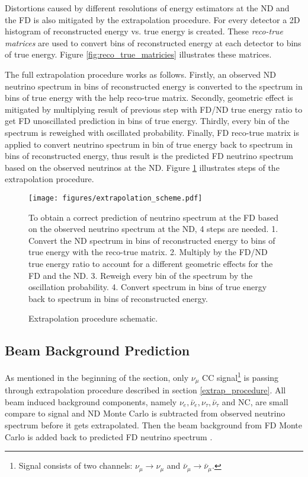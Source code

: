 Distortions caused by different resolutions of energy estimators at the ND and the FD is also mitigated by
the extrapolation procedure. For every detector a 2D histogram of reconstructed energy vs. true energy
is created. These \textit{reco-true matrices} are used to convert bins of reconstructed energy at
each detector to bins of true energy. Figure \ref{fig:reco_true_matricies} illustrates these matrices.

The full extrapolation procedure works as follows. Firstly, an observed ND neutrino spectrum in bins of 
reconstructed energy is converted to the spectrum in bins of true energy with the help reco-true 
matrix. Secondly, geometric effect is mitigated by multiplying result of previous step with FD/ND 
true energy ratio to get FD unoscillated prediction in bins of true energy. Thirdly, every bin of the 
spectrum is reweighed with oscillated probability. Finally, FD reco-true matrix is applied to 
convert neutrino spectrum in bin of true energy back to spectrum in bins of reconstructed energy,
thus result is the predicted FD neutrino spectrum based on the observed neutrinos at the ND. 
Figure \ref{fig:extrap_scheme} illustrates steps of the extrapolation procedure.
\begin{figure}[!h]
\centering
\texttt{[image: figures/extrapolation\_scheme.pdf]}
\caption{Extrapolation procedure schematic.}
{To obtain a correct prediction of neutrino spectrum at the FD based on the observed neutrino 
spectrum at the ND, 4 steps are needed. 1. Convert the ND spectrum in bins of reconstructed energy to
bins of true energy with the reco-true matrix. 2. Multiply by the FD/ND true energy ratio to account
for a different geometric effects for the FD and the ND. 3. Reweigh every bin of the spectrum by
the oscillation probability. 4. Convert spectrum in bins of true energy back to spectrum in bins of
reconstructed energy. }
\label{fig:extrap_scheme}
\end{figure}

\subsection{Beam Background Prediction}
As mentioned in the beginning of the section, only $\nu_\mu$ CC signal\footnote{Signal consists of two
channels: $\nu_\mu \rightarrow \nu_\mu$ and $\bar\nu_\mu \rightarrow \bar\nu_\mu$.} is passing 
through extrapolation procedure described in section \ref{extrap_procedure}. All beam induced 
background components, namely $\nu_e, \bar\nu_e, \nu_\tau, \bar\nu_\tau$ and NC, are small compare 
to signal and ND Monte Carlo is subtracted from observed neutrino spectrum before it gets extrapolated.
Then the beam background from FD Monte Carlo is added back to predicted FD neutrino spectrum \cite{extrap_technote}. 


